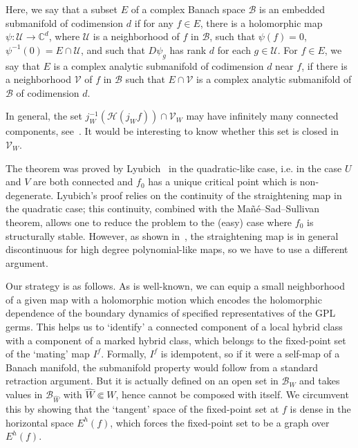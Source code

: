 \documentclass{amsart}
\numberwithin{equation}{section}
\newcommand{\C}{\mathbb C}
\theoremstyle{definition}
\theoremstyle{remark}
\begin{document}
Here, we say that a subset $E$ of a complex Banach space $\mathcal{B}$ is an embedded submanifold of codimension $d$ if for any $f\in E$, there is a holomorphic map $\psi:\mathcal{U}\to \C^d$, where $\mathcal{U}$ is a neighborhood of $f$ in $\mathcal{B}$, such that $\psi(f)=0$, $\psi^{-1}(0)=E\cap\mathcal{U}$, and such that 
$D\psi_g$ has rank $d$ for each $g\in \mathcal{U}$. For $f\in E$, we say that $E$ is a complex analytic submanifold of codimension $d$ near $f$, if there is a neighborhood $\mathcal{V}$ of $f$ in $\mathcal{B}$ such that $E\cap\mathcal{V}$ is a complex analytic submanifold of $\mathcal{B}$  of codimension $d$. 
   
In general, the set $j_W^{-1}(\mathcal{H}(j_W f))\cap\mathcal{V}_W$ may have infinitely many connected components, see~\cite{Branner}. It would be interesting to know whether this set is closed in $\mathcal{V}_W$.

The theorem was proved by Lyubich~\cite[Section 4]{L2} in the quadratic-like case, i.e. in the case $U$ and $V$ are both connected and $f_0$ has a unique critical point which is non-degenerate. Lyubich's proof relies on the continuity of the straightening map in the quadratic case; this continuity, combined with the Ma\~n\'e–Sad–Sullivan theorem, allows one to reduce the problem to the (easy) case where $f_0$ 
is structurally stable.  However, as shown in~\cite[Chapter 3]{DH2}, the straightening map is in general discontinuous for high degree polynomial-like maps, so we have to use a different argument. 

Our strategy is as follows. As is well-known, we can equip a small neighborhood of a given map with a holomorphic motion which encodes the holomorphic dependence of the boundary dynamics of specified representatives of the GPL germs. This helps us to `identify' a connected component of a local hybrid class with a component of a marked hybrid class, which belongs to the fixed-point set of the `mating' map $I^f$.  Formally, $I^f$ is idempotent, so if it were a self-map of a Banach manifold, the submanifold property would follow from a standard retraction argument. 
But it is actually defined on an open set in $\mathcal{B}_W$  
and takes values in $\mathcal{B}_{\widehat{W}}$ with
$\widehat{W}\Subset W$, hence cannot be composed with itself. We circumvent this by showing that the `tangent' space of the fixed-point set at $f$ is dense in the horizontal space $E^h(f)$, which forces the fixed-point set to be a graph over $E^h(f)$. 
\end{document}
